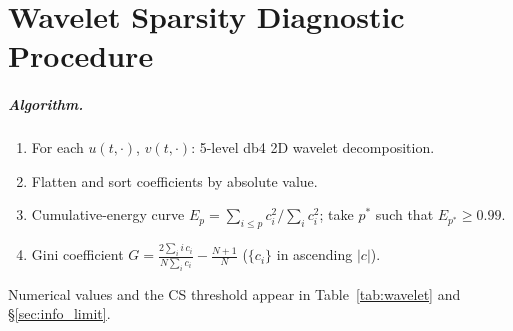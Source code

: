 \chapter{Wavelet Sparsity Diagnostic Procedure}
\label{app:wavelet_diag}

\paragraph{Algorithm.}
\begin{enumerate}
    \item For each $u(t,\cdot)$, $v(t,\cdot)$: 5-level db4 2D wavelet decomposition.
    \item Flatten and sort coefficients by absolute value.
    \item Cumulative-energy curve $E_p = \sum_{i\le p} c_i^2 / \sum_i c_i^2$; take $p^*$ such that $E_{p^*} \ge 0.99$.
    \item Gini coefficient $G = \frac{2\sum_i i\,c_i}{N\sum_i c_i} - \frac{N+1}{N}$ ($\{c_i\}$ in ascending $|c|$).
\end{enumerate}
Numerical values and the CS threshold appear in Table~\ref{tab:wavelet} and \S\ref{sec:info_limit}.

